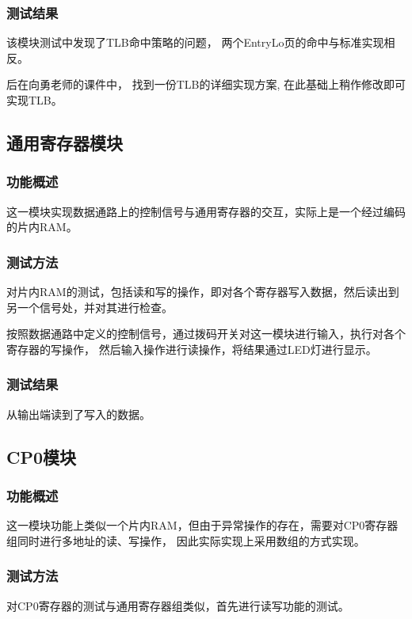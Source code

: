         \subsubsection{测试结果}
            该模块测试中发现了TLB命中策略的问题，%
            两个EntryLo页的命中与标准实现相反。%

            后在向勇老师的课件中，%
            找到一份TLB的详细实现方案,%
            在此基础上稍作修改即可实现TLB。

    \subsection{通用寄存器模块}
        \subsubsection{功能概述}
        这一模块实现数据通路上的控制信号与通用寄存器的交互，实际上是一个经过编码的片内RAM。 
        
        \subsubsection{测试方法}
        对片内RAM的测试，包括读和写的操作，即对各个寄存器写入数据，然后读出到另一个信号处，并对其进行检查。 

        按照数据通路中定义的控制信号，通过拨码开关对这一模块进行输入，执行对各个寄存器的写操作，%
        然后输入操作进行读操作，将结果通过LED灯进行显示。

        \subsubsection{测试结果}
        从输出端读到了写入的数据。

    \subsection{CP0模块}
        \subsubsection{功能概述}
        这一模块功能上类似一个片内RAM，但由于异常操作的存在，需要对CP0寄存器组同时进行多地址的读、写操作，%
        因此实际实现上采用数组的方式实现。
        \subsubsection{测试方法}
        对CP0寄存器的测试与通用寄存器组类似，首先进行读写功能的测试。

